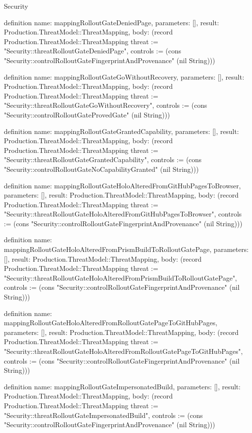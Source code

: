 \begin{lexlean}{Security}
\begin{semanticmodule}
definition{
  name: mappingRolloutGateDeniedPage,
  parameters: [],
  result: Production.ThreatModel::ThreatMapping,
  body: (record Production.ThreatModel::ThreatMapping {threat := "Security::threatRolloutGateDeniedPage", controls := (cons "Security::controlRolloutGateFingerprintAndProvenance" (nil String))})
}

definition{
  name: mappingRolloutGateGoWithoutRecovery,
  parameters: [],
  result: Production.ThreatModel::ThreatMapping,
  body: (record Production.ThreatModel::ThreatMapping {threat := "Security::threatRolloutGateGoWithoutRecovery", controls := (cons "Security::controlRolloutGateProvedGate" (nil String))})
}

definition{
  name: mappingRolloutGateGrantedCapability,
  parameters: [],
  result: Production.ThreatModel::ThreatMapping,
  body: (record Production.ThreatModel::ThreatMapping {threat := "Security::threatRolloutGateGrantedCapability", controls := (cons "Security::controlRolloutGateNoCapabilityGranted" (nil String))})
}

definition{
  name: mappingRolloutGateHoloAlteredFromGitHubPagesToBrowser,
  parameters: [],
  result: Production.ThreatModel::ThreatMapping,
  body: (record Production.ThreatModel::ThreatMapping {threat := "Security::threatRolloutGateHoloAlteredFromGitHubPagesToBrowser", controls := (cons "Security::controlRolloutGateFingerprintAndProvenance" (nil String))})
}

definition{
  name: mappingRolloutGateHoloAlteredFromPrismBuildToRolloutGatePage,
  parameters: [],
  result: Production.ThreatModel::ThreatMapping,
  body: (record Production.ThreatModel::ThreatMapping {threat := "Security::threatRolloutGateHoloAlteredFromPrismBuildToRolloutGatePage", controls := (cons "Security::controlRolloutGateFingerprintAndProvenance" (nil String))})
}

definition{
  name: mappingRolloutGateHoloAlteredFromRolloutGatePageToGitHubPages,
  parameters: [],
  result: Production.ThreatModel::ThreatMapping,
  body: (record Production.ThreatModel::ThreatMapping {threat := "Security::threatRolloutGateHoloAlteredFromRolloutGatePageToGitHubPages", controls := (cons "Security::controlRolloutGateFingerprintAndProvenance" (nil String))})
}

definition{
  name: mappingRolloutGateImpersonatedBuild,
  parameters: [],
  result: Production.ThreatModel::ThreatMapping,
  body: (record Production.ThreatModel::ThreatMapping {threat := "Security::threatRolloutGateImpersonatedBuild", controls := (cons "Security::controlRolloutGateFingerprintAndProvenance" (nil String))})
}


\end{semanticmodule}
\end{lexlean}
